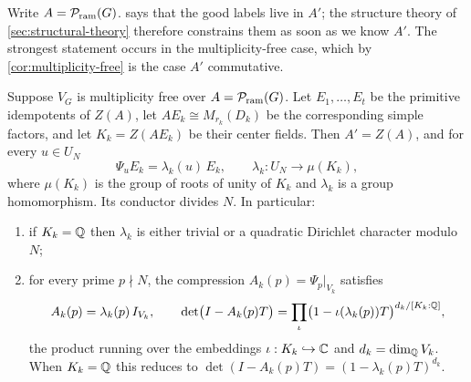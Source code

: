 Write \(A=\mathcal P_{\mathrm{ram}}(G)\).   says that the good
labels live in \(A'\); the structure theory of \cref{sec:structural-theory}
therefore constrains them as soon as we know \(A'\).  The strongest
statement occurs in the multiplicity-free case, which by
\cref{cor:multiplicity-free} is the case \(A'\) commutative.

\begin{theorem}
\label{thm:good-label-characters}
Suppose \(V_G\) is multiplicity free over \(A=\mathcal P_{\mathrm{ram}}(G)\).  Let
\(E_1,\dots,E_t\) be the primitive idempotents of \(Z(A)\), let
\(A E_k\cong M_{r_k}(D_k)\) be the corresponding simple factors, and let
\(K_k=Z(AE_k)\) be their center fields.  Then \(A'=Z(A)\), and for every
\(u\in U_N\)
\begin{equation}
 \Psi_uE_k=\lambda_k(u)\,E_k,
 \qquad
 \lambda_k:U_N\longrightarrow\mu(K_k),
 \label{eq:good-label-character}
\end{equation}
where \(\mu(K_k)\) is the group of roots of unity of \(K_k\) and
\(\lambda_k\) is a group homomorphism.  Its conductor divides \(N\).  In
particular:
\begin{enumerate}
\item if \(K_k=\mathbb Q\) then \(\lambda_k\) is either trivial or a quadratic
Dirichlet character modulo \(N\);
\item for every prime \(p\nmid N\), the compression
\(A_k(p)=\Psi_p|_{V_k}\) satisfies
\begin{equation}
 A_k(p)=\lambda_k(p)\,I_{V_k},
 \qquad
 \det\bigl(I-A_k(p)T\bigr)=\prod_{\iota}\bigl(1-\iota(\lambda_k(p))T\bigr)^{d_k/[K_k:\mathbb Q]},
 \label{eq:good-local-factor}
\end{equation}
the product running over the embeddings \(\iota:K_k\hookrightarrow\mathbb C\) and
\(d_k=\dim_\mathbb Q V_k\).  When \(K_k=\mathbb Q\) this reduces to
\(\det(I-A_k(p)T)=(1-\lambda_k(p)T)^{d_k}\).
\end{enumerate}
\end{theorem}

